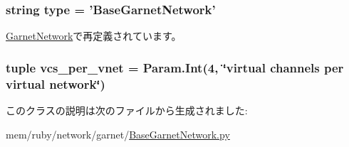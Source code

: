 \label{classBaseGarnetNetwork_1_1BaseGarnetNetwork_a0b76d8599630f795ff97703fe84ff7d9}
\hypertarget{classBaseGarnetNetwork_1_1BaseGarnetNetwork_acce15679d830831b0bbe8ebc2a60b2ca}{
\subsubsection[{type}]{\setlength{\rightskip}{0pt plus 5cm}string {\bf type} = '{\bf BaseGarnetNetwork}'}}
\label{classBaseGarnetNetwork_1_1BaseGarnetNetwork_acce15679d830831b0bbe8ebc2a60b2ca}


\hyperlink{classGarnetNetwork_1_1GarnetNetwork_acce15679d830831b0bbe8ebc2a60b2ca}{GarnetNetwork}で再定義されています。\hypertarget{classBaseGarnetNetwork_1_1BaseGarnetNetwork_a2bb2221cda9b94b6a0c2944d8a12f31e}{
\subsubsection[{vcs\_\-per\_\-vnet}]{\setlength{\rightskip}{0pt plus 5cm}tuple {\bf vcs\_\-per\_\-vnet} = Param.Int(4, \char`\"{}virtual channels per virtual network\char`\"{})}}
\label{classBaseGarnetNetwork_1_1BaseGarnetNetwork_a2bb2221cda9b94b6a0c2944d8a12f31e}


このクラスの説明は次のファイルから生成されました:\begin{DoxyCompactItemize}
\item 
mem/ruby/network/garnet/\hyperlink{BaseGarnetNetwork_8py}{BaseGarnetNetwork.py}\end{DoxyCompactItemize}

